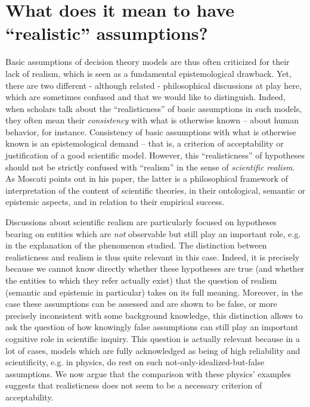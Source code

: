 \documentclass[a4paper,11pt]{article}
\theoremstyle{definition}
\begin{document}
\section{What does it mean to have ``realistic'' assumptions?}
\label{sec:realisticness}
Basic assumptions of decision theory models are thus often criticized for their lack of realism, which is seen as a fundamental epistemological drawback. Yet, there are two different - although related - philosophical discussions at play here, which are sometimes confused and that we would like to distinguish. Indeed, when scholars talk about the ``realisticness'' of basic assumptions in such models, they often mean their \textit{consistency} with what is otherwise known -- about human behavior, for instance. Consistency of basic assumptions with what is otherwise known is an epistemological demand -- that is, a criterion of acceptability or justification of a good scientific model. However, this ``realisticness'' of hypotheses should not be strictly confused with ``realism'' in the sense of \textit{scientific realism}. As Moscati points out in his paper, the latter is a philosophical framework of interpretation of the content of scientific theories, in their ontological, semantic or epistemic aspects, and in relation to their empirical success. 

Discussions about scientific realism are particularly focused on hypotheses bearing on entities which are \textit{not} observable but still play an important role, e.g. in the explanation of the phenomenon studied. The distinction between realisticness and realism is thus quite relevant in this case. Indeed, it is precisely because we cannot know directly whether these hypotheses are true (and whether the entities to which they refer actually exist) that the question of realism (semantic and epistemic in particular) takes on its full meaning. Moreover, in the case these assumptions can be assessed and are shown to be false, or more precisely inconsistent with some background knowledge, this distinction allows to ask the question of how knowingly false assumptions can still play an important cognitive role in scientific inquiry. This question is actually relevant because in a lot of cases, models which are fully acknowledged as being of high reliability and scientificity, e.g. in physics, do rest on such not-only-idealized-but-false assumptions. We now argue that the comparison with these physics’ examples suggests that realisticness does not seem to be a necessary criterion of acceptability.
\end{document}
